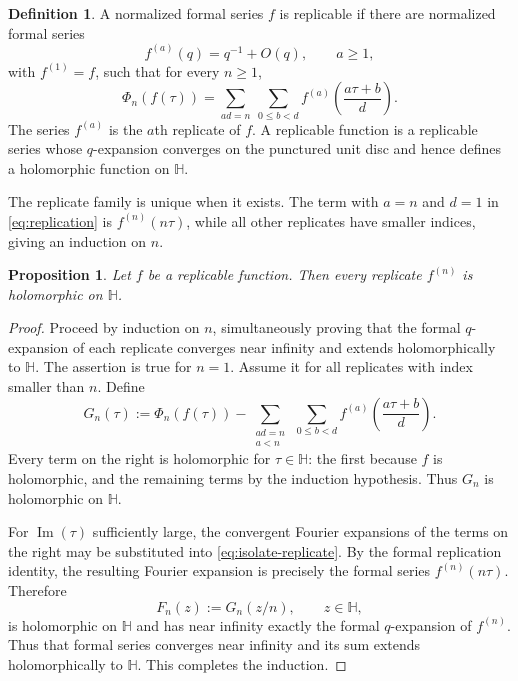 \documentclass[12pt]{amsart}
\newtheorem{prop}[thm]{Proposition}
\theoremstyle{definition}
\newtheorem{defn}[thm]{Definition}
\theoremstyle{remark}
\numberwithin{equation}{section}
\newcommand{\Hh}{\mathbb H}
\begin{document}
\begin{defn}\label{def:replicable}
A normalized formal series $f$ is replicable if there are normalized formal series
\[
f^{(a)}(q)=q^{-1}+O(q),\qquad a\geq1,
\]
with $f^{(1)}=f$, such that for every $n\geq1$,
\begin{equation}\label{eq:replication}
\Phi_n(f(\tau))
=
\sum_{ad=n}\ \sum_{0\leq b<d}
 f^{(a)}\!\left(\frac{a\tau+b}{d}\right).
\end{equation}
The series $f^{(a)}$ is the $a$th replicate of $f$. A replicable function is a replicable series whose $q$-expansion converges on the punctured unit disc and hence defines a holomorphic function on $\Hh$.
\end{defn}

The replicate family is unique when it exists. The term with $a=n$ and $d=1$ in \eqref{eq:replication} is $f^{(n)}(n\tau)$, while all other replicates have smaller indices, giving an induction on $n$.

\begin{prop}\label{prop:analytic-replicates}
Let $f$ be a replicable function. Then every replicate $f^{(n)}$ is holomorphic on $\Hh$.
\end{prop}

\begin{proof}
Proceed by induction on $n$, simultaneously proving that the formal $q$-expansion of each replicate converges near infinity and extends holomorphically to $\Hh$. The assertion is true for $n=1$. Assume it for all replicates with index smaller than $n$. Define
\begin{equation}\label{eq:isolate-replicate}
G_n(\tau)
:=
\Phi_n(f(\tau))
-
\sum_{\substack{ad=n\\a<n}}
\ \sum_{0\leq b<d}
 f^{(a)}\!\left(\frac{a\tau+b}{d}\right).
\end{equation}
Every term on the right is holomorphic for $\tau\in\Hh$: the first because $f$ is holomorphic, and the remaining terms by the induction hypothesis. Thus $G_n$ is holomorphic on $\Hh$.

For $\operatorname{Im}(\tau)$ sufficiently large, the convergent Fourier expansions of the terms on the right may be substituted into \eqref{eq:isolate-replicate}. By the formal replication identity, the resulting Fourier expansion is precisely the formal series $f^{(n)}(n\tau)$. Therefore
\[
F_n(z):=G_n(z/n),\qquad z\in\Hh,
\]
is holomorphic on $\Hh$ and has near infinity exactly the formal $q$-expansion of $f^{(n)}$. Thus that formal series converges near infinity and its sum extends holomorphically to $\Hh$. This completes the induction.
\end{proof}
\end{document}
